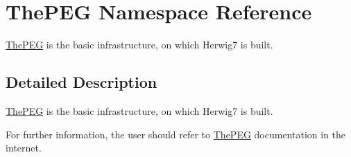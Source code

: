 \hypertarget{namespace_the_p_e_g}{}\section{The\+P\+EG Namespace Reference}
\label{namespace_the_p_e_g}


\hyperlink{namespace_the_p_e_g}{The\+P\+EG} is the basic infrastructure, on which Herwig7 is built.  




\subsection{Detailed Description}
\hyperlink{namespace_the_p_e_g}{The\+P\+EG} is the basic infrastructure, on which Herwig7 is built. 

For further information, the user should refer to \hyperlink{namespace_the_p_e_g}{The\+P\+EG} documentation in the internet. 